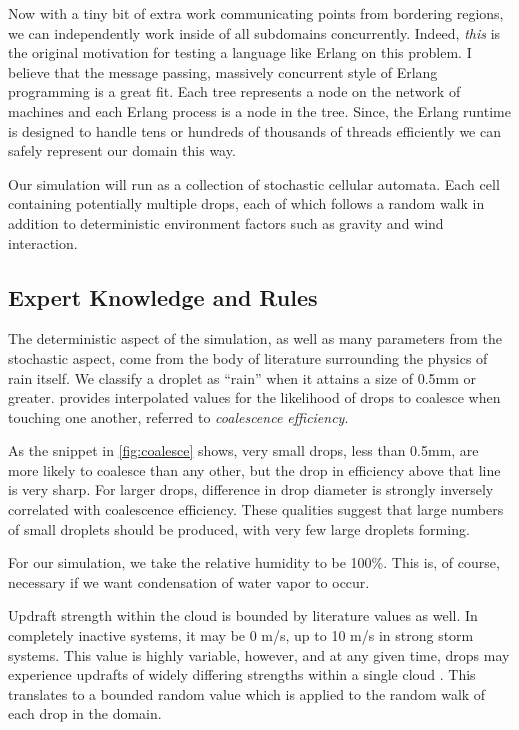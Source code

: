 \documentclass[twocolumn,a4paper,10pt]{article}
\begin{document}
Now with a tiny bit of extra work communicating points from bordering regions,
we can independently work inside of all subdomains concurrently. Indeed,
\emph{this} is the original motivation for testing a language like Erlang on
this problem. I believe that the message passing, massively concurrent style of
Erlang programming is a great fit. Each tree represents a node on the network of
machines and each Erlang process is a node in the tree. Since, the Erlang
runtime is designed to handle tens or hundreds of thousands of threads
efficiently we can safely represent our domain this way.

Our simulation will run as a collection of stochastic cellular automata. Each
cell containing potentially multiple drops, each of which follows a random walk
in addition to deterministic environment factors such as gravity and wind
interaction.


\subsection{Expert Knowledge and Rules}
\label{sec:rules}

The deterministic aspect of the simulation, as well as many parameters from the
stochastic aspect, come from the body of literature surrounding the physics of
rain itself. We classify a droplet as ``rain'' when it attains a size of 0.5mm
or greater. \citet{coalesce} provides interpolated values for the likelihood of
drops to coalesce when touching one another, referred to \emph{coalescence
efficiency}.

As the snippet in \autoref{fig:coalesce} shows, very small drops, less than
0.5mm, are more likely to coalesce than any other, but the drop in efficiency
above that line is very sharp. For larger drops, difference in drop diameter is
strongly inversely correlated with coalescence efficiency. These qualities
suggest that large numbers of small droplets should be produced, with very few
large droplets forming.

For our simulation, we take the relative humidity to be 100\%. This is, of
course, necessary if we want condensation of water vapor to occur.

Updraft strength within the cloud is bounded by literature values as well. In
completely inactive systems, it may be 0 m/s, up to 10 m/s in strong storm
systems. This value is highly variable, however, and at any given time, drops
may experience updrafts of widely differing strengths within a single cloud
\cite{microstructure}. This translates to a bounded random value which is
applied to the random walk of each drop in the domain.
\end{document}
